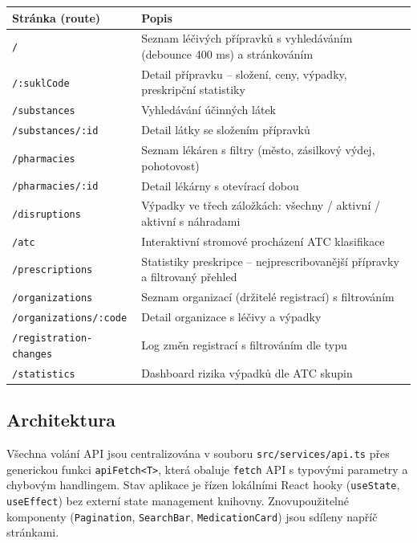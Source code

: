 \documentclass[12pt,a4paper]{article}
\begin{document}
\begin{longtable}{@{}lp{9cm}@{}}
\toprule
\textbf{Stránka (route)} & \textbf{Popis} \\
\midrule
\endhead
\texttt{/} & Seznam léčivých přípravků s vyhledáváním (debounce 400 ms) a stránkováním \\[0.3em]
\texttt{/:suklCode} & Detail přípravku -- složení, ceny, výpadky, preskripční statistiky \\[0.3em]
\texttt{/substances} & Vyhledávání účinných látek \\[0.3em]
\texttt{/substances/:id} & Detail látky se složením přípravků \\[0.3em]
\texttt{/pharmacies} & Seznam lékáren s filtry (město, zásilkový výdej, pohotovost) \\[0.3em]
\texttt{/pharmacies/:id} & Detail lékárny s otevírací dobou \\[0.3em]
\texttt{/disruptions} & Výpadky ve třech záložkách: všechny / aktivní / aktivní s náhradami \\[0.3em]
\texttt{/atc} & Interaktivní stromové procházení ATC klasifikace \\[0.3em]
\texttt{/prescriptions} & Statistiky preskripce -- nejprescribovanější přípravky a filtrovaný přehled \\[0.3em]
\texttt{/organizations} & Seznam organizací (držitelé registrací) s filtrováním \\[0.3em]
\texttt{/organizations/:code} & Detail organizace s léčivy a výpadky \\[0.3em]
\texttt{/registration-changes} & Log změn registrací s filtrováním dle typu \\[0.3em]
\texttt{/statistics} & Dashboard rizika výpadků dle ATC skupin \\
\bottomrule
\end{longtable}

\subsection{Architektura}

Všechna volání API jsou centralizována v souboru \texttt{src/services/api.ts} přes generickou funkci \texttt{apiFetch<T>}, která obaluje \texttt{fetch} API s typovými parametry a chybovým handlingem. Stav aplikace je řízen lokálními React hooky (\texttt{useState}, \texttt{useEffect}) bez externí state management knihovny. Znovupoužitelné komponenty (\texttt{Pagination}, \texttt{SearchBar}, \texttt{MedicationCard}) jsou sdíleny napříč stránkami.
\end{document}

